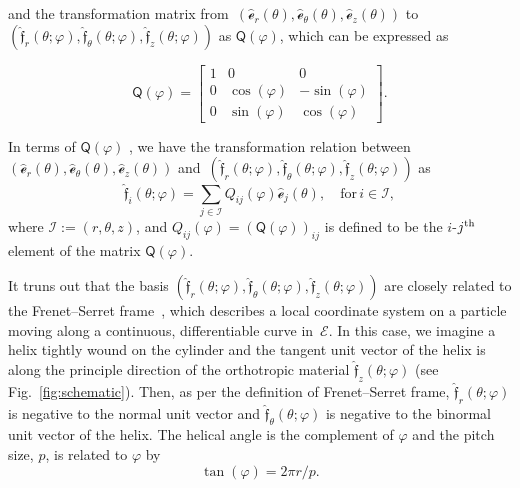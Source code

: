 \documentclass[preprint,12pt,times,draft]{elsarticle}
\numberwithin{equation}{section}
\newcommand{\physe}{\hat{\mathscr{e}}} %
\newcommand{\physf}{\hat{\boldsymbol{\mathfrak{f}}}}
\renewcommand{\u}[1]{\boldsymbol{#1}}
\newcommand{\usf}[1]{\u{\mathsf #1}}
\newcommand{\pr}[1]{\left( #1 \right)}
\renewcommand{\>}{$\Rightarrow$}
\begin{document}
and the transformation matrix from~$(\physe_{r}(\theta),\physe_{\theta}(\theta),\physe_{z}(\theta))$ to~$\pr{\physf_{r}(\theta;\varphi),\physf_{\theta}(\theta;\varphi),\physf_{z}(\theta;\varphi)}$ as $\usf{Q}(\varphi)$, which can be expressed as

\begin{equation}
\usf{Q}(\varphi)
= \begin{bmatrix}
1 & 0 & 0 \\
 0 & \cos(\varphi) & -\sin(\varphi) \\
 0 & \sin(\varphi) & \cos(\varphi)
 \end{bmatrix}.
\end{equation}

In terms of $\usf{Q}(\varphi)$ , we have the transformation relation between~$(\physe_{r}(\theta),\physe_{\theta}(\theta),\physe_{z}(\theta))$ and~$\pr{\physf_{r}(\theta;\varphi),\physf_{\theta}(\theta;\varphi),\physf_{z}(\theta;\varphi)}$ as
\begin{equation}
\physf_{i} (\theta;\varphi) = \sum_{j \in \mathcal{I} } Q_{ij}(\varphi)\physe_{j}(\theta), \quad \text{for} \,i \in \mathcal{I} ,
\label{eq:Qtransform}
\end{equation}
where $\mathcal{I} :=\pr{r,\theta,z}$, and $Q_{ij}(\varphi) = \pr{\usf{Q}(\varphi)}_{ij}$ is defined to be the $i$-$j^{\rm th}$ element of the matrix $\usf{Q}(\varphi)$.

It truns out that the basis $\pr{\physf_{r}(\theta;\varphi),\physf_{\theta}(\theta;\varphi),\physf_{z}(\theta;\varphi)}$ are closely related to the Frenet–Serret frame~\cite{forsyth1912lectures}, which describes a local coordinate system on a particle moving along a continuous, differentiable curve in~$\mathcal{E}$. In this case, we imagine a helix tightly wound on the cylinder and the tangent unit vector of the helix is along the principle direction of the orthotropic material $\physf_{z}(\theta;\varphi)$ (see Fig.~\ref{fig:schematic}). Then, as per the definition of Frenet–Serret frame, $\physf_{r}(\theta;\varphi)$ is negative to the normal unit vector and $\physf_{\theta}(\theta;\varphi)$ is negative to the binormal unit vector of the helix.
The helical angle is the complement of $\varphi$ and the pitch size, $p$, is related to $\varphi$ by
\begin{equation}
\tan(\varphi) = 2 \pi r/p.
\label{eq:AnglePitch}
\end{equation}
\end{document}
